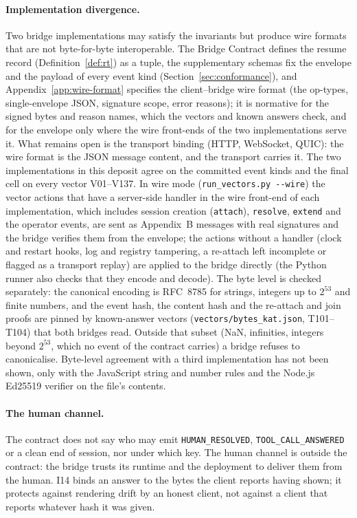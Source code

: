 \paragraph{Implementation divergence.} Two bridge implementations may
satisfy the invariants but produce wire formats that are not
byte-for-byte interoperable. The Bridge Contract defines the resume record
(Definition~\ref{def:rt}) as a tuple, the supplementary schemas fix
the envelope and the payload of every event kind
(Section~\ref{sec:conformance}), and Appendix~\ref{app:wire-format}
specifies the client--bridge wire format (the op-types,
single-envelope JSON, signature scope, error reasons); it is normative
for the signed bytes and reason names, which the vectors and known
answers check, and for the envelope only where the wire front-ends of the
two implementations serve it. What remains
open is the transport binding (HTTP, WebSocket, QUIC): the wire
format is the JSON message content, and the transport carries it.
The two implementations in this deposit agree on the committed event
kinds and the final cell on every vector V01--V137. In wire mode
(\texttt{run\_vectors.py -{}-wire}) the vector actions that have a
server-side handler in the wire front-end of each implementation, which
includes session creation (\texttt{attach}), \texttt{resolve}, \texttt{extend} and the
operator events, are sent as
Appendix~B messages with real signatures and the bridge verifies them from the
envelope; the actions without a handler (clock and restart hooks, log and
registry tampering, a re-attach left incomplete or flagged as a transport
replay) are applied to the bridge directly (the Python runner also checks that they encode and decode).
The byte level is checked separately: the
canonical encoding is RFC~8785 for strings, integers up to $2^{53}$ and
finite numbers, and the event hash, the content hash and the
re-attach and join proofs are pinned by known-answer vectors
(\texttt{vectors/bytes\_kat.json}, T101--T104) that both bridges read.
Outside that subset (NaN, infinities, integers beyond $2^{53}$, which
no event of the contract carries) a bridge refuses to canonicalise.
Byte-level agreement with a third implementation has not been shown,
only with the JavaScript string and number rules and the Node.js Ed25519
verifier on the file's contents.

\paragraph{The human channel.} The contract does not say who may emit
\texttt{HUMAN\_RESOLVED}, \texttt{TOOL\_CALL\_ANSWERED} or a clean end of
session, nor under which key. The human channel is outside the contract:
the bridge trusts its runtime and the deployment to deliver them from the
human. I14 binds an answer to the bytes the client reports having shown;
it protects against rendering drift by an honest client, not against a
client that reports whatever hash it was given.


